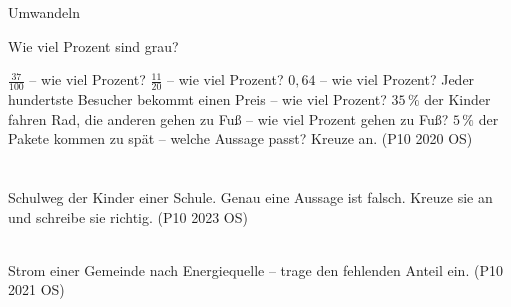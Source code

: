 \setcounter{aufgabe}{8}

\begin{aufgabe}{Umwandeln}
\begin{teile}
\teil Wie viel Prozent sind grau?

\teil $\frac{37}{100}$ – wie viel Prozent? \leerfeld[\%]
\teil $\frac{11}{20}$ – wie viel Prozent? \leerfeld[\%]
\teil $0{,}64$ – wie viel Prozent? \leerfeld[\%]
\teil Jeder hundertste Besucher bekommt einen Preis – wie viel Prozent? \leerfeld[\%]
\teil $35\,\%$ der Kinder fahren Rad, die anderen gehen zu Fuß – wie viel Prozent gehen zu Fuß? \leerfeld[\%]
\teil $5\,\%$ der Pakete kommen zu spät – welche Aussage passt? Kreuze an. \hfill (P10 2020 OS)\\ \\ \\ 
\teil Schulweg der Kinder einer Schule. Genau eine Aussage ist falsch. Kreuze sie an und schreibe sie richtig. \hfill (P10 2023 OS)\\ \\ 

\teil Strom einer Gemeinde nach Energiequelle – trage den fehlenden Anteil ein. \hfill (P10 2021 OS)

\end{teile}
\end{aufgabe}

